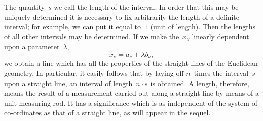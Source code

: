\documentclass[12pt]{book}[2005/09/16]
\newcommand{\PageSep}[1]{\ignorespaces}
\begin{document}
The quantity~$s$ we call the length of the interval. In
order that this may be uniquely determined it is necessary
to fix arbitrarily the length of a definite interval; for
example, we can put it equal to~$1$ (unit of length). Then
the lengths of all other intervals may be determined. If
we make the~$x_{\nu}$ linearly dependent upon a parameter~$\lambda$,
\[
x_{\nu} = a_{\nu} + \lambda b_{\nu},
\]
\PageSep{6}
we obtain a line which has all the properties of the straight
lines of the Euclidean geometry. In particular, it easily
follows that by laying off $n$~times the interval~$s$ upon a
straight line, an interval of length~$n·s$ is obtained. A
length, therefore, means the result of a measurement
carried out along a straight line by means of a unit
measuring rod. It has a significance which is as independent
of the system of co-ordinates as that of a straight
line, as will appear in the sequel.
\end{document}
